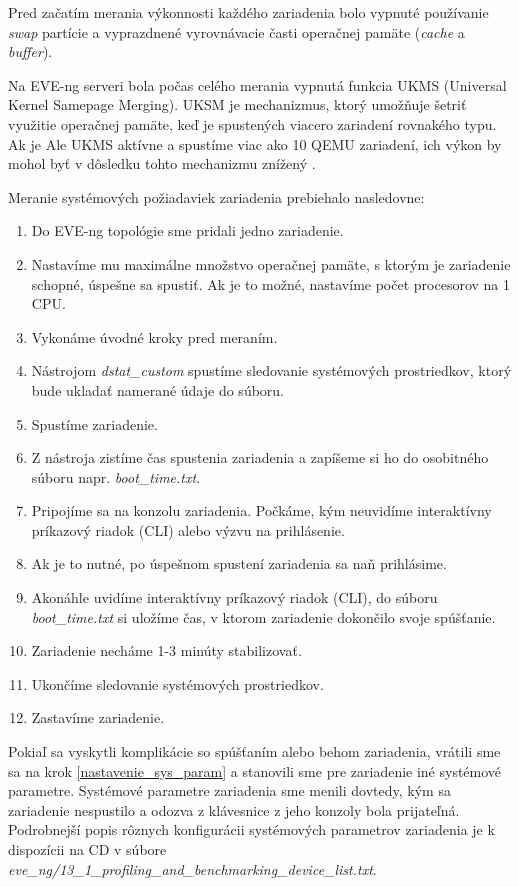 Pred začatím merania výkonnosti každého zariadenia bolo vypnuté používanie \emph{swap} partície a vyprazdnené vyrovnávacie časti operačnej pamäte (\emph{cache} a \emph{buffer}).

Na EVE-ng serveri bola počas celého merania vypnutá funkcia UKMS (Universal Kernel Samepage Merging). UKSM je mechanizmus, ktorý umožňuje šetriť využitie operačnej pamäte, keď je spustených viacero zariadení rovnakého typu. Ak je Ale UKMS aktívne a spustíme viac ako 10 QEMU zariadení, ich výkon by mohol byť v dôsledku tohto mechanizmu znížený \cite{eve_ng_faq}.

\noindent
Meranie systémových požiadaviek zariadenia prebiehalo nasledovne:

\begin{enumerate}[noitemsep]
    \item Do EVE-ng topológie sme pridali jedno zariadenie.
    \item \label{nastavenie_sys_param} Nastavíme mu maximálne množstvo operačnej pamäte, s ktorým je zariadenie schopné, úspešne sa spustiť. Ak je to možné, nastavíme počet procesorov na 1 CPU.
    \item Vykonáme úvodné kroky pred meraním.
    \item Nástrojom \emph{dstat\_custom} spustíme sledovanie systémových prostriedkov, ktorý bude ukladať namerané údaje do súboru.
    \item Spustíme zariadenie.
    \item Z nástroja zistíme čas spustenia zariadenia a zapíšeme si ho do osobitného súboru napr. \emph{boot\_time.txt}.
    \item Pripojíme sa na konzolu zariadenia. Počkáme, kým neuvidíme interaktívny príkazový riadok (CLI) alebo výzvu na prihlásenie.
    \item Ak je to nutné, po úspešnom spustení zariadenia sa naň prihlásime.
    \item Akonáhle uvidíme interaktívny príkazový riadok (CLI), do súboru \emph{boot\_time.txt} si uložíme čas, v ktorom zariadenie dokončilo svoje spúšťanie. 
    \item Zariadenie necháme 1-3 minúty stabilizovať.
    \item Ukončíme sledovanie systémových prostriedkov.
    \item Zastavíme zariadenie.
\end{enumerate}

Pokiaľ sa vyskytli komplikácie so spúšťaním alebo behom zariadenia, vrátili sme sa na krok \ref{nastavenie_sys_param} a stanovili sme pre zariadenie iné systémové parametre. Systémové parametre zariadenia sme menili dovtedy, kým sa zariadenie nespustilo a odozva z klávesnice z jeho konzoly bola prijateľná. Podrobnejší popis rôznych konfigurácii systémových parametrov zariadenia je k dispozícii na CD v súbore \emph{eve\_ng/13\_1\_profiling\_and\_benchmarking\_device\_list.txt}.

